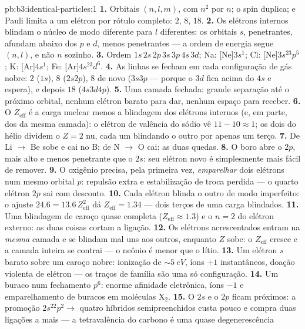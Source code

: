 \begin{solution}{pb:b3:identical-particles:1}
\textbf{1.} Orbitais $(n, l, m)$, com $n^2$ por $n$; o spin duplica; e
Pauli limita a um elétron por rótulo completo: $2$, $8$, $18$.
\textbf{2.} Os elétrons internos blindam o núcleo de modo diferente
para $l$ diferentes: os orbitais $s$, penetrantes, afundam abaixo dos
$p$ e $d$, menos penetrantes --- a ordem de energia segue $(n, l)$, e
não $n$ sozinho.
\textbf{3.} Ordem $1s\,2s\,2p\,3s\,3p\,4s\,3d$; Na: [Ne]$3s^1$;
Cl: [Ne]$3s^23p^5$; K: [Ar]$4s^1$; Fe: [Ar]$4s^23d^6$.
\textbf{4.} As linhas se fecham em cada configuração de gás nobre: $2$
($1s$), $8$ ($2s2p$), $8$ de novo ($3s3p$ --- porque o $3d$ fica acima
do $4s$ e espera), e depois $18$ ($4s3d4p$).
\textbf{5.} Uma camada fechada: grande separação até o próximo orbital,
nenhum elétron barato para dar, nenhum espaço para receber.
\textbf{6.} O $Z_{\text{eff}}$ é a carga nuclear menos a blindagem dos
elétrons internos (e, em parte, dos da mesma camada): o elétron de
valência do sódio vê $11 - 10 \approx 1$; os dois do hélio dividem o
$Z = 2$ nu, cada um blindando o outro por apenas um terço.
\textbf{7.} De Li $\to$ Be sobe e cai no B; de N $\to$ O cai: as duas
quedas.
\textbf{8.} O boro abre o $2p$, mais alto e menos penetrante que o
$2s$: seu elétron novo é simplesmente mais fácil de remover.
\textbf{9.} O oxigênio precisa, pela primeira vez, \emph{emparelhar}
dois elétrons num mesmo orbital $p$: repulsão extra e estabilização de
troca perdida --- o quarto elétron $2p$ sai com desconto.
\textbf{10.} Cada elétron blinda o outro de modo imperfeito: o ajuste
$24.6 = 13.6\,Z_{\text{eff}}^2$ dá $Z_{\text{eff}} =
1.34$ --- dois terços de uma carga blindados.
\textbf{11.} Uma blindagem de caroço quase completa ($Z_{\text{eff}}
\approx 1.3$) e o $n = 2$ do elétron externo: as duas coisas cortam a
ligação.
\textbf{12.} Os elétrons acrescentados entram na \emph{mesma} camada e
se blindam mal uns aos outros, enquanto $Z$ sobe: o $Z_{\text{eff}}$
cresce e a camada inteira se contrai --- o neônio é menor que o lítio.
\textbf{13.} Um elétron $s$ barato sobre um caroço nobre: ionização de
$\sim\qty{5}{eV}$, íons $+1$ instantâneos, doação violenta de elétron
--- os traços de família são uma só configuração.
\textbf{14.} Um buraco num fechamento $p^6$: enorme afinidade
eletrônica, íons $-1$ e emparelhamento de buracos em moléculas X$_2$.
\textbf{15.} O $2s$ e o $2p$ ficam próximos: a promoção $2s^22p^2 \to$
quatro híbridos semipreenchidos custa pouco e compra duas ligações a
mais --- a tetravalência do carbono é uma quase degenerescência

\end{solution}
